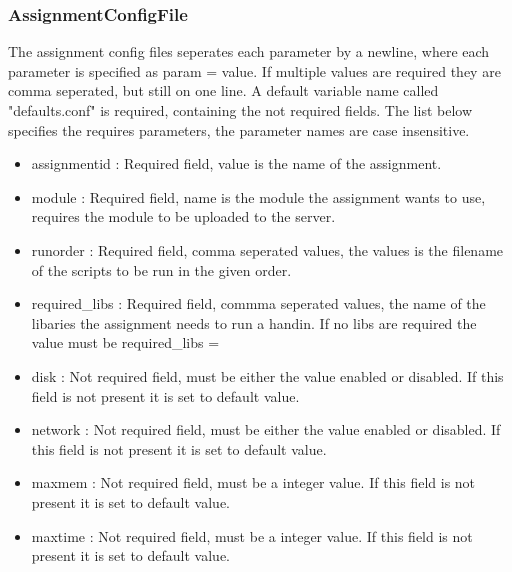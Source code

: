 \subsubsection{AssignmentConfigFile}
\label{sec:assignment}
The assignment config files seperates each parameter by a newline, where each parameter is specified as param = value. If multiple values are required they are comma seperated, but still on one line. A default variable name called "defaults.conf" is required, containing the not required fields.
The list below specifies the requires parameters, the parameter names are case insensitive.
\begin{itemize}
    \item assignmentid : Required field, value is the name of the assignment.
    \item module : Required field, name is the module the assignment wants to use, requires the module to be uploaded to the server.
    \item runorder : Required field, comma seperated values, the values is the filename of the scripts to be run in the given order.
    \item required\_libs : Required field, commma seperated values, the name of the libaries the assignment needs to run a handin. If no libs are required the value must be required\_libs =
    \item disk : Not required field, must be either the value enabled or disabled. If this field is not present it is set to default value.
    \item network : Not required field, must be either the value enabled or disabled. If this field is not present it is set to default value.
    \item maxmem : Not required field, must be a integer value. If this field is not present it is set to default value.
    \item maxtime : Not required field, must be a integer value. If this field is not present it is set to default value.
\end{itemize}







